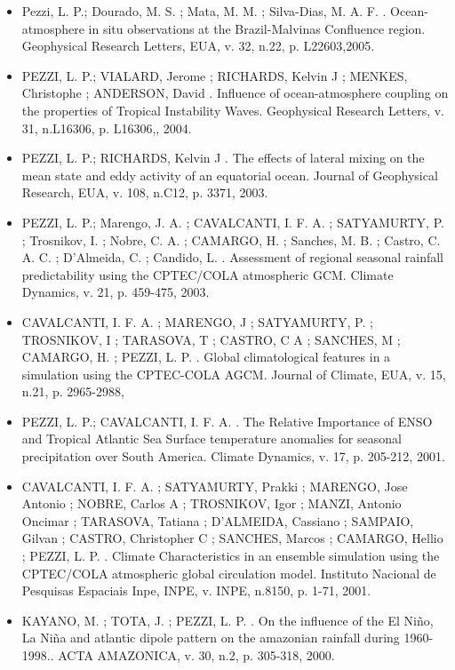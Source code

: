 \documentclass[11pt, a4paper]{awesome-cv}
\begin{document}
\begin{cvletter}
\begin{itemize}
  \item[] Pezzi, L. P.; Dourado, M. S. ; Mata, M. M. ; Silva-Dias, M. A. F. . Ocean-atmosphere in situ 
  observations at the Brazil-Malvinas Confluence region. Geophysical Research Letters, EUA, v. 32, 
  n.22, p. L22603,2005.

  \item[] PEZZI, L. P.; VIALARD, Jerome ; RICHARDS, Kelvin J ; MENKES, Christophe ; ANDERSON, David . 
  Influence of ocean-atmosphere coupling on the properties of Tropical Instability Waves. 
  Geophysical Research Letters, v. 31, n.L16306, p. L16306,, 2004.

  \item[] PEZZI, L. P.; RICHARDS, Kelvin J . The effects of lateral mixing on the mean state and eddy 
  activity of an equatorial ocean. Journal of Geophysical Research, EUA, v. 108, n.C12, p. 3371, 2003.

  \item[] PEZZI, L. P.; Marengo, J. A. ; CAVALCANTI, I. F. A. ; SATYAMURTY, P. ; Trosnikov, I. ; 
  Nobre, C. A. ; CAMARGO, H. ; Sanches, M. B. ; Castro, C. A. C. ; D'Almeida, C. ; Candido, L. . 
  Assessment of regional seasonal rainfall predictability using the CPTEC/COLA atmospheric GCM. 
  Climate Dynamics, v. 21, p. 459-475,
  2003.

  \item[] 	CAVALCANTI, I. F. A. ; MARENGO, J ; SATYAMURTY, P. ; TROSNIKOV, I ; TARASOVA, T ; CASTRO, 
  C A ; SANCHES, M ; CAMARGO, H. ; PEZZI, L. P. . Global climatological features in a simulation 
  using the CPTEC-COLA AGCM. Journal of Climate, EUA, v. 15, n.21, p. 2965-2988,

  \item[] PEZZI, L. P.; CAVALCANTI, I. F. A. . The Relative Importance of ENSO and Tropical 
  Atlantic Sea Surface temperature anomalies for seasonal precipitation over South America. 
  Climate Dynamics, v. 17, p. 205-212, 2001. 

  \item[] CAVALCANTI, I. F. A. ; SATYAMURTY, Prakki ; MARENGO, Jose Antonio ; NOBRE, Carlos A ;
  TROSNIKOV, Igor ; MANZI, Antonio Oncimar ; TARASOVA, Tatiana ; D'ALMEIDA, Cassiano ; SAMPAIO, 
  Gilvan ; CASTRO, Christopher C ; SANCHES, Marcos ; CAMARGO, Hellio ; PEZZI, L. P. . Climate 
  Characteristics in an ensemble simulation using the CPTEC/COLA atmospheric global circulation 
  model. Instituto Nacional de Pesquisas Espaciais Inpe, INPE, v. INPE, n.8150, p. 1-71, 2001. 

  \item[] KAYANO, M. ; TOTA, J. ; PEZZI, L. P. . On the influence of the El Niño, La Niña and atlantic
  dipole pattern on the amazonian rainfall during 1960-1998.. ACTA AMAZONICA, v. 30, n.2, p. 
  305-318, 2000. 


\end{itemize}
\end{cvletter}
\end{document}
